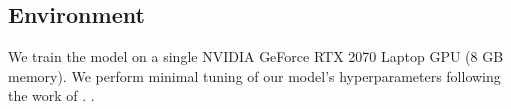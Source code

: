 \subsection{Environment}
We train the model on a single NVIDIA GeForce RTX 2070 Laptop GPU (8 GB memory). We perform minimal tuning of our model's hyperparameters following the work of .
.
